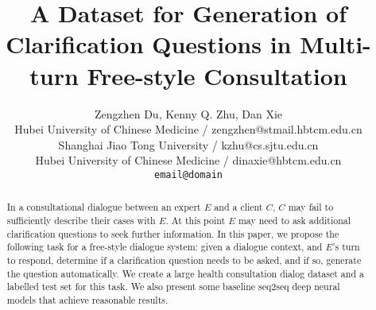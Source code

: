 \documentclass[11pt,a4paper]{article}
\title{A Dataset for Generation of Clarification Questions in Multi-turn Free-style Consultation}
\author{Zengzhen Du, Kenny Q. Zhu, Dan Xie \\
Hubei University of Chinese Medicine / zengzhen@stmail.hbtcm.edu.cn \\
Shanghai Jiao Tong University / kzhu@cs.sjtu.edu.cn \\
Hubei University of Chinese Medicine / dinaxie@hbtcm.edu.cn \\
\texttt{email@domain} \\\And
}
\date{}
\begin{document}
\maketitle
\begin{abstract}
In a consultational dialogue between an expert $E$ and a client $C$, $C$ may fail to
sufficiently describe their cases with $E$. At this point $E$ may need to ask additional
clarification questions to seek further information. In this paper, we propose the following
task for a free-style dialogue system: given a dialogue context, and $E$'s turn to respond,
determine if a clarification question needs to be asked, and if so, 
generate the question automatically. We create a large health consultation dialog dataset
and a labelled test set for this task. We also present some baseline
seq2seq deep neural models that achieve reasonable results.
\end{abstract}








	


	
\end{document}
